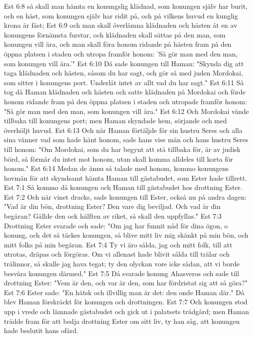 Est 6:8  så skall man hämta en konungslig klädnad, som konungen själv har burit, och en häst, som konungen själv har ridit på, och på vilkens huvud en kunglig krona är fäst;
Est 6:9  och man skall överlämna klädnaden och hästen åt en av konungens förnämsta furstar, och klädnaden skall sättas på den man, som konungen vill ära, och man skall föra honom ridande på hästen fram på den öppna platsen i staden och utropa framför honom: 'Så gör man med den man, som konungen vill ära.'"
Est 6:10  Då sade konungen till Haman: "Skynda dig att taga klädnaden och hästen, såsom du har sagt, och gör så med juden Mordokai, som sitter i konungens port. Underlåt intet av allt vad du har sagt."
Est 6:11  Så tog då Haman klädnaden och hästen och satte klädnaden på Mordokai och förde honom ridande fram på den öppna platsen i staden och utropade framför honom: "Så gör man med den man, som konungen vill ära."
Est 6:12  Och Mordokai vände tillbaka till konungens port; men Haman skyndade hem, sörjande och med överhöljt huvud.
Est 6:13  Och när Haman förtäljde för sin hustru Seres och alla sina vänner vad som hade hänt honom, sade hans vise män och hans hustru Seres till honom: "Om Mordokai, som du har begynt att stå tillbaka för, är av judisk börd, så förmår du intet mot honom, utan skall komma alldeles till korta för honom."
Est 6:14  Medan de ännu så talade med honom, kommo konungens hovmän för att skyndsamt hämta Haman till gästabudet, som Ester hade tillrett.
Est 7:1  Så kommo då konungen och Haman till gästabudet hos drottning Ester.
Est 7:2  Och när vinet dracks, sade konungen till Ester, också nu på andra dagen: "Vad är din bön, drottning Ester? Den vare dig beviljad. Och vad är din begäran? Gällde den ock hälften av riket, så skall den uppfyllas."
Est 7:3  Drottning Ester svarade och sade: "Om jag har funnit nåd för dina ögon, o konung, och det så täckes konungen, så blive mitt liv mig skänkt på min bön, och mitt folks på min begäran.
Est 7:4  Ty vi äro sålda, jag och mitt folk, till att utrotas, dräpas och förgöras. Om vi allenast hade blivit sålda till trälar och trälinnor, så skulle jag hava tegat; ty den olyckan vore icke sådan, att vi borde besvära konungen därmed."
Est 7:5  Då svarade konung Ahasveros och sade till drottning Ester: "Vem är den, och var är den, som har fördristat sig att så göra?"
Est 7:6  Ester sade: "En hätsk och illvillig man är det: den onde Haman där." Då blev Haman förskräckt för konungen och drottningen.
Est 7:7  Och konungen stod upp i vrede och lämnade gästabudet och gick ut i palatsets trädgård; men Haman trädde fram för att bedja drottning Ester om sitt liv, ty han såg, att konungen hade beslutit hans ofärd.
